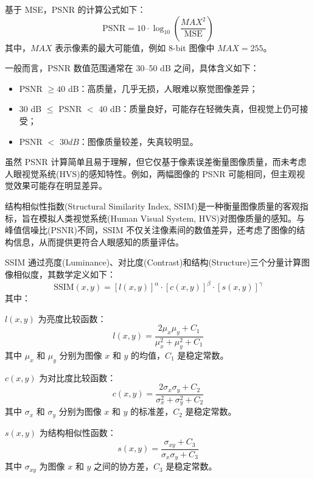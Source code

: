 基于 MSE，PSNR 的计算公式如下：
\begin{equation}
    \text{PSNR} = 10 \cdot \log_{10} \left( \frac{MAX^2}{\text{MSE}} \right)
\end{equation}
其中，$MAX$ 表示像素的最大可能值，例如 8-bit 图像中 $MAX = 255$。

一般而言，PSNR 数值范围通常在 30–50 dB 之间，具体含义如下：
\begin{itemize}
    \item PSNR $\geq 40$ dB：高质量，几乎无损，人眼难以察觉图像差异；
    \item 30 dB $\leq$ PSNR $<$ 40 dB：质量良好，可能存在轻微失真，但视觉上仍可接受；
    \item PSNR $<$ 30$ dB$：图像质量较差，失真较明显。
\end{itemize}

虽然 PSNR 计算简单且易于理解，但它仅基于像素误差衡量图像质量，而未考虑人眼视觉系统(HVS)的感知特性。例如，两幅图像的 PSNR 可能相同，但主观视觉效果可能存在明显差异。

结构相似性指数(Structural Similarity Index, SSIM)是一种衡量图像质量的客观指标，旨在模拟人类视觉系统(Human Visual System, HVS)对图像质量的感知。与峰值信噪比(PSNR)不同，SSIM 不仅关注像素间的数值差异，还考虑了图像的结构信息，从而提供更符合人眼感知的质量评估。

SSIM 通过亮度(Luminance)、对比度(Contrast)和结构(Structure)三个分量计算图像相似度，其数学定义如下：
\begin{equation}
\text{SSIM}(x, y) = [l(x, y)]^\alpha \cdot [c(x, y)]^\beta \cdot [s(x, y)]^\gamma
\end{equation}
其中：

$l(x, y)$ 为亮度比较函数：
\begin{equation}
l(x, y) = \frac{2\mu_x\mu_y + C_1}{\mu_x^2 + \mu_y^2 + C_1}
\end{equation}
其中 $\mu_x$ 和 $\mu_y$ 分别为图像 $x$ 和 $y$ 的均值，$C_1$ 是稳定常数。

$c(x, y)$ 为对比度比较函数：
\begin{equation}
c(x, y) = \frac{2\sigma_x\sigma_y + C_2}{\sigma_x^2 + \sigma_y^2 + C_2}
\end{equation}
其中 $\sigma_x$ 和 $\sigma_y$ 分别为图像 $x$ 和 $y$ 的标准差，$C_2$ 是稳定常数。

$s(x, y)$ 为结构相似性函数：
\begin{equation}
s(x, y) = \frac{\sigma_{xy} + C_3}{\sigma_x \sigma_y + C_3}
\end{equation}
其中 $\sigma_{xy}$ 为图像 $x$ 和 $y$ 之间的协方差，$C_3$ 是稳定常数。


